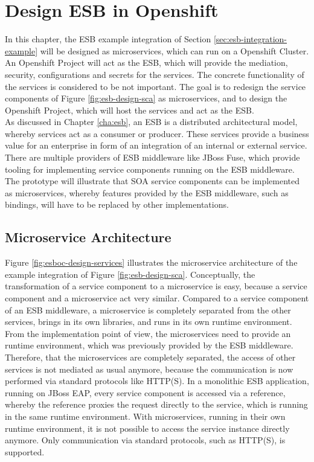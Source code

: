 \chapter{Design ESB in Openshift}
\label{cha:esboc}
In this chapter, the ESB example integration of Section \vref{sec:esb-integration-example} will be designed as microservices, which can run on a Openshift Cluster. An Openshift Project will act as the ESB, which will provide the mediation, security, configurations and secrets for the services. The concrete functionality of the services is considered to be not important. The goal is to redesign the service components of Figure \vref{fig:esb-design-sca} as microservices, and to design the Openshift Project, which will host the services and act as the ESB. \\

As discussed in Chapter \vref{cha:esb}, an ESB is a distributed architectural model, whereby services act as a consumer or producer. These services provide a business value for an enterprise in form of an integration of an internal or external service. There are multiple providers of ESB middleware like JBoss Fuse, which provide tooling for implementing service components running on the ESB middleware. The prototype will illustrate that SOA service components can be implemented as microservices, whereby features provided by the ESB middleware, such as bindings, will have to be replaced by other implementations.

\section{Microservice Architecture}
Figure \vref{fig:esboc-design-services} illustrates the microservice architecture of the example integration of Figure \vref{fig:esb-design-sca}. Conceptually, the transformation of a service component to a microservice is easy, because a service component and a microservice act very similar. Compared to a service component of an ESB middleware, a microservice is completely separated from the other services, brings in its own libraries, and runs in its own runtime environment. From the implementation point of view, the microservices need to provide an runtime environment, which was previously provided by the ESB middleware. Therefore, that the microservices are completely separated, the access of other services is not mediated as usual anymore, because the communication is now performed via standard protocols like HTTP(S). In a monolithic ESB application, running on JBoss EAP, every service component is accessed via a reference, whereby the reference proxies the request directly to the service, which is running in the same runtime environment. With microservices, running in their own runtime environment, it is not possible to access the service instance directly anymore. Only communication via standard protocols, such as HTTP(S), is supported.

